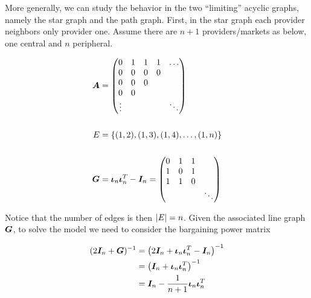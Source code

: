 More generally, we can study the behavior in the two ``limiting'' acyclic graphs, namely the star graph and the path graph. First, in the star graph each provider neighbors only provider one. Assume there are $n + 1$ providers/markets as below, one central and $n$ peripheral.

\vspace{5mm}
\begin{minipage}{.5\textwidth}
  \resizebox{\textwidth}{!}{}
\end{minipage}
\begin{minipage}{.5\textwidth}
  \begin{equation*}
    \begin{split}
      \matr{A} &= \begin{pmatrix}
        0      & 1 & 1 & 1 & \ldots \\
        0      & 0 & 0 & 0 &        \\
        0      & 0 & 0 &   &        \\
        0      & 0 &   &   &        \\
        \vdots &   &   &   & \ddots
      \end{pmatrix} \\
      \vspace{5mm} \\
      E &= \set{(1, 2), (1, 3), (1, 4), \ldots, (1, n)} \\
      \vspace{5mm} \\
      \G &= \matr{\iota}_n \matr{\iota}_n^T - \I_n =  \begin{pmatrix}
        0 & 1 & 1 &        \\
        1 & 0 & 1 &        \\
        1 & 1 & 0 &        \\
          &   &   & \ddots
      \end{pmatrix}
    \end{split}
  \end{equation*}
\end{minipage}
\vspace{5mm}

Notice that the number of edges is then $\lvert E\rvert = n$. Given the associated line graph $\bm{G}$, to solve the model we need to consider the bargaining power matrix

\begin{equation*}
  \begin{split}
    (2\bm{I}_n + \bm{G})^{-1} &= \left( 2\bm{I}_n + \bm{\iota}_n \bm{\iota}_n^T - \bm{I}_n \right)^{-1}\\
    &= \left( \bm{I}_n + \bm{\iota}_n \bm{\iota}_n^T \right)^{-1} \\
    &= \bm{I}_n - \frac{1}{n + 1} \bm{\iota}_n \bm{\iota}_n^T
  \end{split}
\end{equation*}

